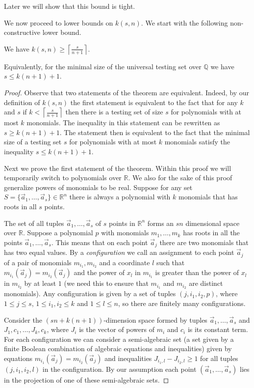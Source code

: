 \documentclass[11pt]{article}
\newcommand{\bb}[1]{\mathbb{#1}}
\begin{document}
Later we will show that this bound is tight.

We now proceed to lower bounds on $k(s,n)$. We start with the following non-constructive lower bound.
\begin{theorem} \label{thm:univ_set_nonconstructive}
We have $k(s,n) \geq \left\lceil \frac{s}{n+1}\right\rceil$.

Equivalently, for the minimal size of the universal testing set over $\bb{Q}$ we have $s \leq k(n+1) + 1$.
\end{theorem}

\begin{proof}
Observe that two statements of the theorem are equivalent. Indeed, by our definition of $k(s,n)$ the first statement is equivalent to the fact that for any $k$ and $s$ if $k < \left\lceil \frac{s}{n+1}\right\rceil$ then there is a testing set of size $s$ for polynomials with at most $k$ monomials. The inequality in this statement can be rewritten as $s \geq k(n+1) + 1$.  The statement then is equivalent to the fact that the minimal size of a testing set $s$ for polynomials with at most $k$ monomials satisfy the inequality $s \leq k(n+1) + 1$.


Next we prove the first statement of the theorem.
Within this proof we will temporarily switch to polynomials over $\bb{R}$. We also for the sake of this proof generalize powers of monomials to be real.
Suppose for any set $S = \{\vec{a}_1,\ldots, \vec{a}_s\} \in \bb{R}^n$ there is always a polynomial with $k$ monomials that has roots in all $s$ points.

The set of all tuples $\vec{a}_1,\ldots, \vec{a}_s$ of $s$ points in $\bb{R}^n$ forms an $sn$ dimensional space over $\bb{R}$.
Suppose a polynomial $p$ with monomials $m_1,\ldots, m_k$ has roots in all the points $\vec{a}_1,\ldots, \vec{a}_s$. This means that on each point $\vec{a}_j$ there are two monomials that has two equal values. 
By a \emph{configuration} we call an assignment to each point $\vec{a}_j$ of a pair of monomials $m_{i_1},m_{i_2}$ and a coordinate $l$ such that $m_{i_1}(\vec{a}_j) = m_{i_2}(\vec{a}_j)$ and the power of $x_l$ in $m_{i_1}$ is greater than the power of $x_l$ in $m_{i_2}$ by at least $1$ (we need this to ensure that $m_{i_1}$ and $m_{i_2}$ are distinct monomials). Any configuration is given by a set of tuples $(j,i_1,i_2, p)$, where $1\leq j\leq s$, $1 \leq i_1,i_2\leq k$ and $1 \leq l \leq n$, so there are finitely many configurations. 

Consider the $(sn+k(n+1))$-dimension space formed by tuples $\vec{a}_1,\ldots, \vec{a}_s$ and $J_{1},c_{1},\ldots, J_k, c_k$, where $J_i$ is the vector of powers of $m_i$ and $c_i$ is its constant term. For each configuration we can consider a semi-algebraic set (a set given by a finite Boolean combination of algebraic equations and inequalities) given by equations $m_{i_1}(\vec{a}_j)= m_{i_2}(\vec{a}_j)$ and inequalities $J_{i_1,l} - J_{i_2,l} \geq 1$ for all tuples $(j,i_1, i_2,l)$ in the configuration. By our assumption each point $(\vec{a}_1,\ldots, \vec{a}_s)$ lies in the projection of one of these semi-algebraic sets.


\end{proof}
\end{document}
